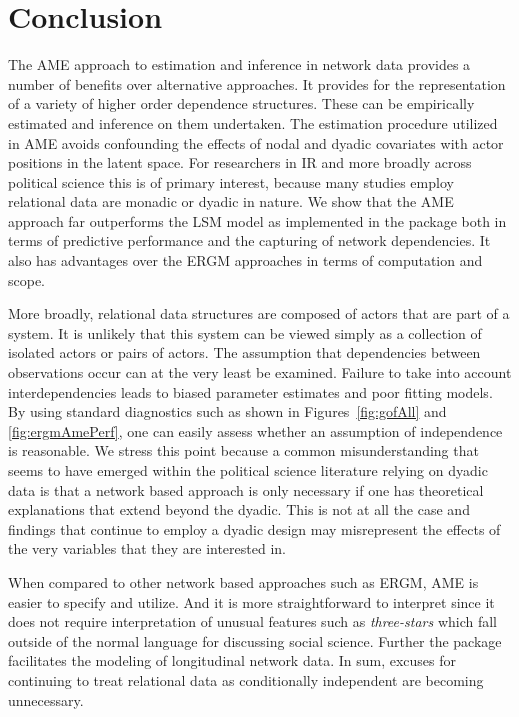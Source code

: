 \section{\textbf{Conclusion}}

The AME approach to estimation and inference in network data provides a number of benefits over alternative approaches. It provides for the representation of a variety of higher order dependence structures. These can be empirically estimated and inference on them undertaken.
The estimation procedure utilized in AME avoids confounding the effects of nodal and dyadic covariates with actor positions in the latent space. For researchers in IR and more broadly across political science this is of primary interest, because many studies employ relational data are monadic or dyadic in nature. We show that the AME approach far outperforms the LSM model as implemented in the  package both in terms of predictive performance and the capturing of network dependencies. It also has advantages over the ERGM approaches in terms of computation and scope. 

More broadly,  relational data structures are composed of actors that are part of a system. It is unlikely that this system can be viewed simply as a collection of isolated actors or pairs of actors. The assumption  that dependencies between observations occur can at the very least be examined. Failure to take into account interdependencies leads to biased parameter estimates and 
poor fitting models. By using standard diagnostics such as shown in  Figures~\ref{fig:gofAll} and \ref{fig:ergmAmePerf}, one can easily assess whether an assumption of independence is reasonable. We stress this point   because a common misunderstanding that seems to have emerged within the political science literature relying on dyadic data is that a network based approach is only necessary if one has theoretical explanations that extend beyond the dyadic. This is not at all the case and findings that continue to employ a dyadic design may misrepresent the effects of the very variables that they are interested in. 

When compared to other network based approaches such as ERGM, AME is   easier to   specify and utilize. And it is more straightforward to interpret since it does not require interpretation of unusual features such as \textit{three-stars} which fall outside of the normal language for discussing social science.  Further the  package facilitates the modeling of longitudinal network data. In sum, excuses for continuing to treat relational data as conditionally independent are becoming unnecessary. 